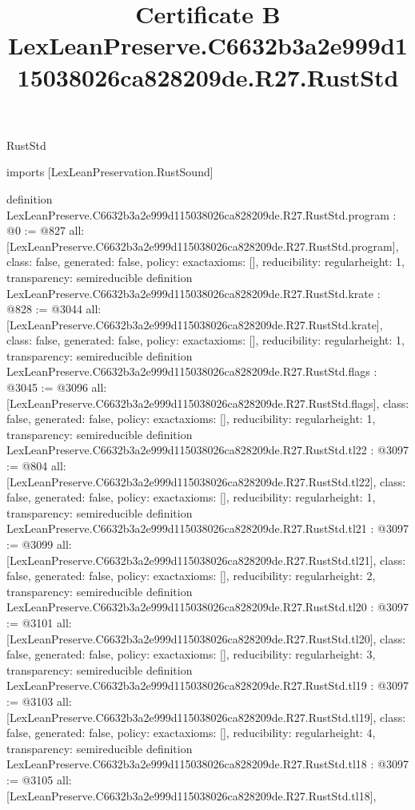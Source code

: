 \begin{lexlean}{RustStd}
\title{Certificate B LexLeanPreserve.C6632b3a2e999d115038026ca828209de.R27.RustStd}
\begin{coremodule}
imports [LexLeanPreservation.RustSound]

definition LexLeanPreserve.C6632b3a2e999d115038026ca828209de.R27.RustStd.program : @0 := @827 {
  all: [LexLeanPreserve.C6632b3a2e999d115038026ca828209de.R27.RustStd.program],
  class: false,
  generated: false,
  policy: exact{axioms: []},
  reducibility: regular{height: 1},
  transparency: semireducible
}
definition LexLeanPreserve.C6632b3a2e999d115038026ca828209de.R27.RustStd.krate : @828 := @3044 {
  all: [LexLeanPreserve.C6632b3a2e999d115038026ca828209de.R27.RustStd.krate],
  class: false,
  generated: false,
  policy: exact{axioms: []},
  reducibility: regular{height: 1},
  transparency: semireducible
}
definition LexLeanPreserve.C6632b3a2e999d115038026ca828209de.R27.RustStd.flags : @3045 := @3096 {
  all: [LexLeanPreserve.C6632b3a2e999d115038026ca828209de.R27.RustStd.flags],
  class: false,
  generated: false,
  policy: exact{axioms: []},
  reducibility: regular{height: 1},
  transparency: semireducible
}
definition LexLeanPreserve.C6632b3a2e999d115038026ca828209de.R27.RustStd.tl22 : @3097 := @804 {
  all: [LexLeanPreserve.C6632b3a2e999d115038026ca828209de.R27.RustStd.tl22],
  class: false,
  generated: false,
  policy: exact{axioms: []},
  reducibility: regular{height: 1},
  transparency: semireducible
}
definition LexLeanPreserve.C6632b3a2e999d115038026ca828209de.R27.RustStd.tl21 : @3097 := @3099 {
  all: [LexLeanPreserve.C6632b3a2e999d115038026ca828209de.R27.RustStd.tl21],
  class: false,
  generated: false,
  policy: exact{axioms: []},
  reducibility: regular{height: 2},
  transparency: semireducible
}
definition LexLeanPreserve.C6632b3a2e999d115038026ca828209de.R27.RustStd.tl20 : @3097 := @3101 {
  all: [LexLeanPreserve.C6632b3a2e999d115038026ca828209de.R27.RustStd.tl20],
  class: false,
  generated: false,
  policy: exact{axioms: []},
  reducibility: regular{height: 3},
  transparency: semireducible
}
definition LexLeanPreserve.C6632b3a2e999d115038026ca828209de.R27.RustStd.tl19 : @3097 := @3103 {
  all: [LexLeanPreserve.C6632b3a2e999d115038026ca828209de.R27.RustStd.tl19],
  class: false,
  generated: false,
  policy: exact{axioms: []},
  reducibility: regular{height: 4},
  transparency: semireducible
}
definition LexLeanPreserve.C6632b3a2e999d115038026ca828209de.R27.RustStd.tl18 : @3097 := @3105 {
  all: [LexLeanPreserve.C6632b3a2e999d115038026ca828209de.R27.RustStd.tl18],
}
\end{coremodule}
\end{lexlean}
